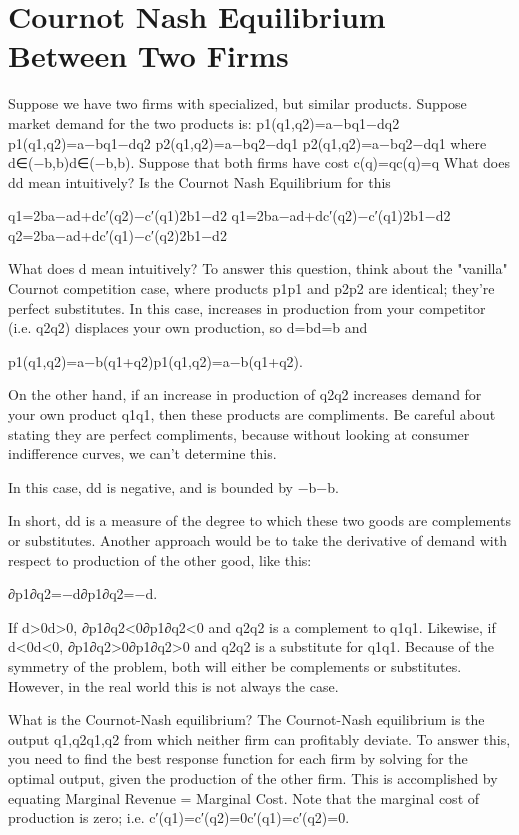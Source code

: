 \section{Cournot Nash Equilibrium Between Two Firms}

Suppose we have two firms with specialized, but similar products. Suppose market demand for the two products is:
p1(q1,q2)=a−bq1−dq2
p1(q1,q2)=a−bq1−dq2
p2(q1,q2)=a−bq2−dq1
p2(q1,q2)=a−bq2−dq1
where d∈(−b,b)d∈(−b,b). Suppose that both firms have cost c(q)=qc(q)=q
What does dd mean intuitively? Is the Cournot Nash Equilibrium for this

q1=2ba−ad+dc′(q2)−c′(q1)2b1−d2
q1=2ba−ad+dc′(q2)−c′(q1)2b1−d2
q2=2ba−ad+dc′(q1)−c′(q2)2b1−d2

What does d mean intuitively?
To answer this question, think about the "vanilla" Cournot competition case, where products p1p1 and p2p2 are identical; they're perfect substitutes. In this case, increases in production from your competitor (i.e. q2q2) displaces your own production, so d=bd=b and

p1(q1,q2)=a−b(q1+q2)p1(q1,q2)=a−b(q1+q2).

On the other hand, if an increase in production of q2q2 increases demand for your own product q1q1, then these products are compliments. Be careful about stating they are perfect compliments, because without looking at consumer indifference curves, we can't determine this.

In this case, dd is negative, and is bounded by −b−b.

In short, dd is a measure of the degree to which these two goods are complements or substitutes. Another approach would be to take the derivative of demand with respect to production of the other good, like this:

∂p1∂q2=−d∂p1∂q2=−d.

If d>0d>0, ∂p1∂q2<0∂p1∂q2<0 and q2q2 is a complement to q1q1. Likewise, if d<0d<0, ∂p1∂q2>0∂p1∂q2>0 and q2q2 is a substitute for q1q1. Because of the symmetry of the problem, both will either be complements or substitutes. However, in the real world this is not always the case.

What is the Cournot-Nash equilibrium?
The Cournot-Nash equilibrium is the output {q1,q2q1,q2} from which neither firm can profitably deviate. To answer this, you need to find the best response function for each firm by solving for the optimal output, given the production of the other firm. This is accomplished by equating Marginal Revenue = Marginal Cost. Note that the marginal cost of production is zero; i.e. c′(q1)=c′(q2)=0c′(q1)=c′(q2)=0.

